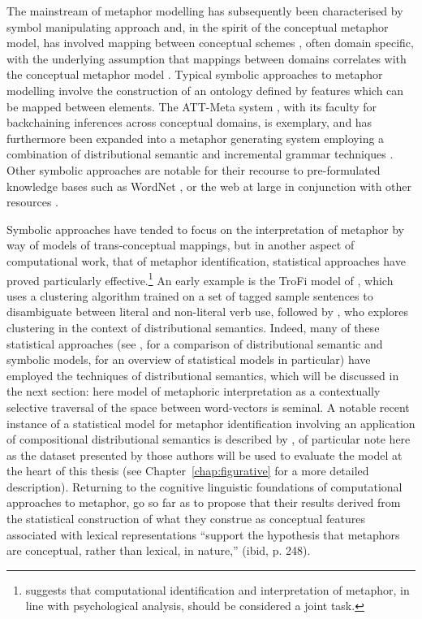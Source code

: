 The mainstream of metaphor modelling has subsequently been characterised by symbol manipulating approach and, in the spirit of the conceptual metaphor model, has  involved mapping between conceptual schemes \citep{Indurkhya1997}, often domain specific, with the underlying assumption that mappings between domains correlates with the conceptual metaphor model \citep{Narayanan1999}.  Typical symbolic approaches to metaphor modelling involve the construction of an ontology defined by features which can be mapped between elements.  The ATT-Meta system \citep{LeeEA2001}, with its faculty for backchaining inferences across conceptual domains, is exemplary, and has furthermore been expanded into a metaphor generating system employing a combination of distributional semantic and incremental grammar techniques \citep{GargettEA2013}.  Other symbolic approaches are notable for their recourse to pre-formulated knowledge bases such as WordNet \citep{VealeEA2015}, or the web at large in conjunction with other resources \citep{VealeEA2007}.

Symbolic approaches have tended to focus on the interpretation of metaphor by way of models of trans-conceptual mappings, but in another aspect of computational work, that of metaphor identification, statistical approaches have proved particularly effective.\footnote{\cite{Shutova2013} suggests that computational identification and interpretation of metaphor, in line with psychological analysis, should be considered a joint task.}  An early example is the TroFi model of \cite{BirkeEA2006}, which uses a clustering algorithm trained on a set of tagged sample sentences to disambiguate between literal and non-literal verb use, followed by \cite{Utsumi2011}, who explores clustering in the context of distributional semantics.  Indeed, many of these statistical approaches (see \citealt{TurneyEA2011}, \citealt{Dunn2013} for a comparison of distributional semantic and symbolic models, \citealt{ShutovaEA2013} for an overview of statistical models in particular) have employed the techniques of distributional semantics, which will be discussed in the next section: here  model of metaphoric interpretation as a contextually selective traversal of the space between word-vectors is seminal.  A notable recent instance of a statistical model for metaphor identification involving an application of compositional distributional semantics is described by \cite{GutierrezEA2016}, of particular note here as the dataset presented by those authors will be used to evaluate the model at the heart of this thesis (see Chapter~\ref{chap:figurative} for a more detailed description).  Returning to the cognitive linguistic foundations of computational approaches to metaphor, \cite{TsvetkovEA2014} go so far as to propose that their results derived from the statistical construction of what they construe as conceptual features associated with lexical representations ``support the hypothesis that metaphors are conceptual, rather than lexical, in nature,'' (ibid, p. 248).

